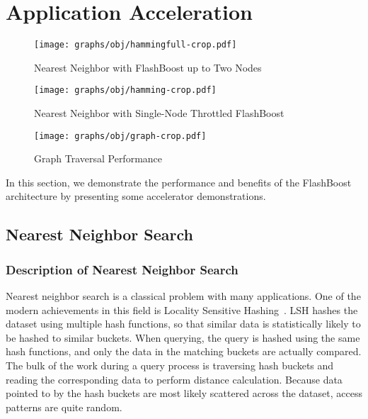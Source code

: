 \section{Application Acceleration}
\label{sec:acceleration}

\begin{figure*}[ht]
\centering
\vspace{0pt}
\begin{minipage}[c]{.3\textwidth}
	\texttt{[image: graphs/obj/hammingfull-crop.pdf]}
	\caption{Nearest Neighbor with FlashBoost up to Two Nodes}
	\label{fig:result_hammingfull}
\end{minipage}\hfill
\vspace{0pt}
\begin{minipage}[c]{.3\textwidth}
	\texttt{[image: graphs/obj/hamming-crop.pdf]}
	\caption{Nearest Neighbor with Single-Node Throttled FlashBoost}
	\label{fig:result_hamming}
\end{minipage}\hfill
\vspace{0pt}
\begin{minipage}[c]{.3\textwidth}
	\texttt{[image: graphs/obj/graph-crop.pdf]}
	\caption{Graph Traversal Performance}
	\label{fig:result_graph}
\end{minipage}
\end{figure*}

In this section, we demonstrate the performance and benefits of the FlashBoost
architecture by presenting some accelerator demonstrations. 

\subsection{Nearest Neighbor Search}
\subsubsection{Description of Nearest Neighbor Search}

Nearest neighbor search is a classical problem with many applications. One of
the modern achievements in this field is Locality Sensitive Hashing~\cite{lsh}.
LSH hashes the dataset using multiple hash functions, so that
similar data is statistically likely to be hashed to similar buckets. When
querying, the query is hashed using the same hash functions, and only the data
in the matching buckets are actually compared. The bulk of the work during a
query process is traversing hash buckets and reading the corresponding data to
perform distance calculation. Because data pointed to by the hash buckets are
most likely scattered across the dataset, access patterns are quite random.


